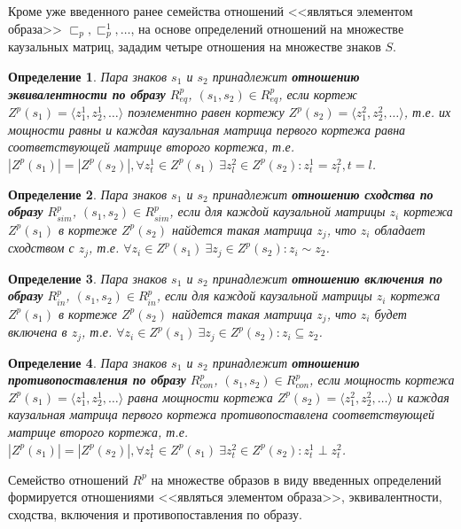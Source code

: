 \documentclass[12pt]{scrartcl}
\newtheorem{definition}{Определение}
\begin{document}
	Кроме уже введенного ранее семейства отношений <<являться элементом образа>> ${\sqsubset_p, \sqsubset_p^1, \dots}$, на основе определений отношений на множестве каузальных матриц, зададим четыре отношения на множестве знаков $S$.
	\begin{definition}
		Пара знаков  $s_1$ и $s_2$ принадлежит \textbf{отношению эквивалентности по образу} $R_{eq}^p$, $(s_1,s_2)\in R_{eq}^p$, если кортеж $Z^p(s_1)=\langle z_1^1,z_2^1,\dots\rangle$ поэлементно равен кортежу $Z^p(s_2)=\langle z_1^2,z_2^2,\dots\rangle$, т.е. их мощности равны и каждая каузальная матрица первого кортежа равна соответствующей матрице второго кортежа, т.е. $|Z^p(s_1)| = |Z^p(s_2)|, \forall z_t^1\in Z^p(s_1)\ \exists z_l^2\in Z^p(s_2): z_t^1=z_l^2, t=l$.
	\end{definition}
	
	\begin{definition}\label{def:sim}
		Пара знаков  $s_1$ и $s_2$ принадлежит \textbf{отношению сходства по образу} $R_{sim}^p$, $(s_1,s_2)\in R_{sim}^p$, если для каждой каузальной матрицы $z_i$ кортежа $Z^p(s_1)$ в кортеже $Z^p(s_2)$ найдется такая матрица $z_j$, что $z_i$ обладает сходством с $z_j$, т.е. $\forall z_i\in Z^p(s_1)\ \exists z_j\in Z^p(s_2): z_i\sim z_2$.
	\end{definition}
	
	\begin{definition}
		Пара знаков  $s_1$ и $s_2$ принадлежит \textbf{отношению включения по образу} $R_{in}^p$, $(s_1,s_2)\in R_{in}^p$, если для каждой каузальной матрицы $z_i$ кортежа $Z^p(s_1)$ в кортеже $Z^p(s_2)$ найдется такая матрица $z_j$, что $z_i$ будет включена в $z_j$, т.е. $\forall z_i\in Z^p(s_1)\ \exists z_j\in Z^p(s_2): z_i\subseteq z_2$.
	\end{definition}

	\begin{definition}
		Пара знаков  $s_1$ и $s_2$ принадлежит \textbf{отношению противопоставления по образу} $R_{con}^p$, $(s_1,s_2)\in R_{con}^p$, если мощность кортежа $Z^p(s_1)=\langle z_1^1,z_2^1,\dots\rangle$ равна мощности кортежа $Z^p(s_2)=\langle z_1^2,z_2^2,\dots\rangle$ и каждая каузальная матрица первого кортежа противопоставлена соответствующей матрице второго кортежа, т.е. $|Z^p(s_1)| = |Z^p(s_2)|, \forall z_t^1\in Z^p(s_1)\ \exists z_t^2\in Z^p(s_2): z_t^1\perp z_t^2$.
	\end{definition}
	
	Семейство отношений $R^p$ на множестве образов в виду введенных определений формируется отношениями <<являться элементом образа>>, эквивалентности, сходства, включения и противопоставления по образу.
		
\end{document}
